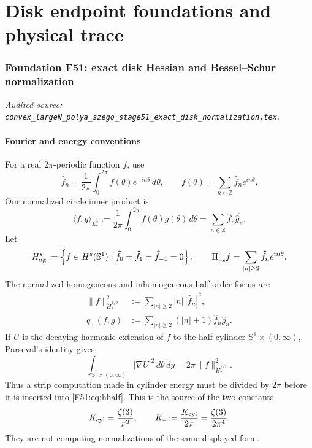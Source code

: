 \documentclass[11pt]{amsart}
\numberwithin{equation}{section}
\theoremstyle{definition}
\theoremstyle{remark}
\newcommand{\Sone}{\mathbb S^1}
\newcommand{\PiNG}{\Pi_{\rm ng}}
\newcommand{\qD}{q_{\mathbb D}}
\newcommand{\qplus}{q_+}
\begin{document}
\part{Disk endpoint foundations and physical trace}

\begingroup
\renewcommand{\qD}{q_{\mathbb D}^{0}}
\section{Foundation F51: exact disk Hessian and Bessel--Schur normalization}
\label{module:F51}
\noindent\textit{Audited source: \nolinkurl{convex_largeN_polya_szego_stage51_exact_disk_normalization.tex}.}
\subsection{Fourier and energy conventions}

For a real $2\pi$-periodic function $f$, use
\begin{equation}
 \widehat f_n=\frac1{2\pi}\int_0^{2\pi}f(\theta)e^{-in\theta}\,d\theta,
 \qquad
 f(\theta)=\sum_{n\in\mathbb Z}\widehat f_ne^{in\theta}.
\end{equation}
Our normalized circle inner product is
\begin{equation}\label{F51:eq:L2-star}
 \langle f,g\rangle_{L^2_*}
 :=\frac1{2\pi}\int_0^{2\pi}f(\theta)\overline{g(\theta)}\,d\theta
 =\sum_{n\in\mathbb Z}\widehat f_n\overline{\widehat g_n}.
\end{equation}
Let
\begin{equation}
 H_{\rm ng}^{s}
 :=\left\{f\in H^s(\Sone):
 \widehat f_0=\widehat f_1=\widehat f_{-1}=0\right\},
 \qquad
 \PiNG f=\sum_{|n|\ge2}\widehat f_ne^{in\theta}.
\end{equation}
The normalized homogeneous and inhomogeneous half-order forms are
\begin{align}
 \|f\|_{\dot H^{1/2}_*}^2
 &:=\sum_{|n|\ge2}|n|\,|\widehat f_n|^2,\label{F51:eq:hhalf}\\
 \qplus(f,g)
 &:=\sum_{|n|\ge2}(|n|+1)\widehat f_n\overline{\widehat g_n}.
 \label{F51:eq:qplus}
\end{align}
If $U$ is the decaying harmonic extension of $f$ to the half-cylinder
$\Sone\times(0,\infty)$, Parseval's identity gives
\begin{equation}\label{F51:eq:cylinder}
 \int_{\Sone\times(0,\infty)}|\nabla U|^2\,d\theta\,dy
 =2\pi\|f\|_{\dot H^{1/2}_*}^2.
\end{equation}
Thus a strip computation made in cylinder energy must be divided by $2\pi$
before it is inserted into \eqref{F51:eq:hhalf}.  This is the source of the two
constants
\begin{equation}\label{F51:eq:twoK}
 K_{\rm cyl}=\frac{\zeta(3)}{\pi^3},
 \qquad
 K_*:=\frac{K_{\rm cyl}}{2\pi}
 =\frac{\zeta(3)}{2\pi^4}.
\end{equation}
They are not competing normalizations of the same displayed form.
\end{document}
